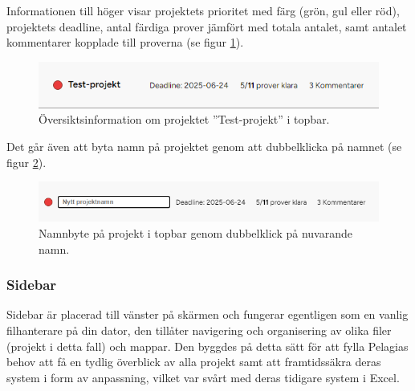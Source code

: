 \noindent Informationen till höger visar projektets prioritet med färg (grön, gul eller röd),
projektets deadline, antal färdiga prover jämfört med totala antalet, samt antalet kommentarer kopplade till proverna
(se figur \ref{fig:topbar_info}).

\begin{figure}[H]
    \centering
    \includegraphics[width=0.8\linewidth]{images/topbar_h_info.PNG}
    \caption{Översiktsinformation om projektet ''Test-projekt'' i topbar.}
    \label{fig:topbar_info}
\end{figure}

\noindent Det går även att byta namn på projektet genom att dubbelklicka på namnet (se figur \ref{fig:topbar_nytt_namn}). 

\begin{figure}[H]
    \centering
    \includegraphics[width=0.8\linewidth]{images/topbar_nytt_namn.PNG}
    \caption{Namnbyte på projekt i topbar genom dubbelklick på nuvarande namn.}
    \label{fig:topbar_nytt_namn}
\end{figure}

\subsubsection{Sidebar}
Sidebar är placerad till vänster på skärmen och fungerar egentligen som en vanlig filhanterare på din dator, den tillåter navigering och organisering av olika filer (projekt i detta fall) och mappar.
Den byggdes på detta sätt för att fylla Pelagias behov att få en tydlig överblick av alla projekt samt att framtidssäkra deras system i form av anpassning,
vilket var svårt med deras tidigare system i Excel.  

